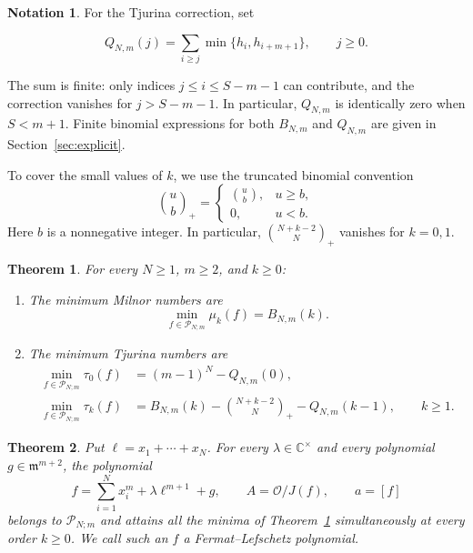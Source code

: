 \documentclass[12pt,reqno]{amsart}
\newcommand{\C}{\mathbb C}
\newcommand{\mm}{\mathfrak m}
\newcommand{\tbin}[2]{\binom{#1}{#2}_{\!+}}
\newcommand{\Pall}{\mathcal P_{N;m}}
\newcommand{\OO}{\mathcal O}
\newtheorem{thmintro}{Theorem}
\theoremstyle{definition}
\newtheorem{notation}[theorem]{Notation}
\begin{document}
\begin{notation}
For the Tjurina correction, set

\begin{equation}\label{eq:Q}
 Q_{N,m}(j)=\sum_{i\geq j}\min\{h_i,h_{i+m+1}\},\qquad j\geq0.
\end{equation}
\end{notation}
The sum is finite: only indices $j\leq i\leq S-m-1$ can
contribute, and the correction vanishes for $j>S-m-1$. In
particular, $Q_{N,m}$ is identically zero when $S<m+1$.
Finite binomial expressions for both $B_{N,m}$ and $Q_{N,m}$ are
given in Section~\ref{sec:explicit}.

To cover the small values of $k$, we use the truncated binomial
convention
\[
 \tbin{u}{b}=
 \begin{cases}\binom{u}{b},&u\geq b,\\0,&u<b.\end{cases}
\]
Here $b$ is a nonnegative integer. In particular,
$\tbin{N+k-2}{N}$ vanishes for $k=0,1$.

 
\begin{thmintro}\label{thm:main}
For every $N\geq1$, $m\geq2$, and $k\geq0$:
\begin{enumerate}
\item The minimum Milnor numbers are
\begin{equation}\label{eq:minmu}
 \min_{f\in\Pall}\mu_k(f)=B_{N,m}(k).
\end{equation}
\item The minimum Tjurina numbers are
\begin{align}
 \min_{f\in\Pall}\tau_0(f)&=(m-1)^N-Q_{N,m}(0),
       \label{eq:minnu0}\\
 \min_{f\in\Pall}\tau_k(f)&=B_{N,m}(k)
              -\tbin{N+k-2}{N}-Q_{N,m}(k-1),\qquad k\geq1.
       \label{eq:minnuk}
\end{align}
\end{enumerate}
\end{thmintro}

\begin{thmintro}\label{thm:family}
Put $\ell=x_1+\cdots+x_N$. For every $\lambda\in\C^\times$ and
every polynomial $g\in\mm^{m+2}$, the polynomial
\begin{equation}\label{eq:family}
 f=\sum_{i=1}^N x_i^m+\lambda\ell^{m+1}+g,\qquad
 A=\OO/J(f),\qquad a=[f]
\end{equation}
belongs to $\Pall$ and attains all the minima of
Theorem~\ref{thm:main} simultaneously at every order $k\geq0$.
We call such an $f$ a \emph{Fermat--Lefschetz polynomial}.
\end{thmintro}
\end{document}
